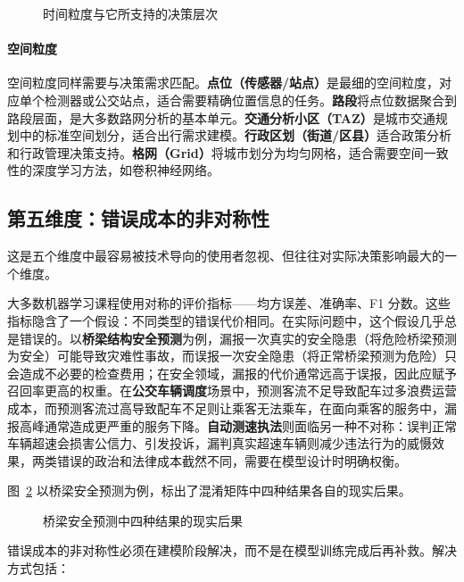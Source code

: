 \begin{figure}[H]
  \centering
  \caption{时间粒度与它所支持的决策层次}
  \label{fig:ch03_gran}
\end{figure}

\paragraph{空间粒度}

空间粒度同样需要与决策需求匹配。\textbf{点位（传感器/站点）}是最细的空间粒度，对应单个检测器或公交站点，适合需要精确位置信息的任务。\textbf{路段}将点位数据聚合到路段层面，是大多数路网分析的基本单元。\textbf{交通分析小区（TAZ）}是城市交通规划中的标准空间划分，适合出行需求建模。\textbf{行政区划（街道/区县）}适合政策分析和行政管理决策支持。\textbf{格网（Grid）}将城市划分为均匀网格，适合需要空间一致性的深度学习方法，如卷积神经网络。

\subsection{第五维度：错误成本的非对称性}

这是五个维度中最容易被技术导向的使用者忽视、但往往对实际决策影响最大的一个维度。

大多数机器学习课程使用对称的评价指标——均方误差、准确率、F1 分数。这些指标隐含了一个假设：不同类型的错误代价相同。在实际问题中，这个假设几乎总是错误的。以\textbf{桥梁结构安全预测}为例，漏报一次真实的安全隐患（将危险桥梁预测为安全）可能导致灾难性事故，而误报一次安全隐患（将正常桥梁预测为危险）只会造成不必要的检查费用；在安全领域，漏报的代价通常远高于误报，因此应赋予召回率更高的权重。在\textbf{公交车辆调度}场景中，预测客流不足导致配车过多浪费运营成本，而预测客流过高导致配车不足则让乘客无法乘车，在面向乘客的服务中，漏报高峰通常造成更严重的服务下降。\textbf{自动测速执法}则面临另一种不对称：误判正常车辆超速会损害公信力、引发投诉，漏判真实超速车辆则减少违法行为的威慑效果，两类错误的政治和法律成本截然不同，需要在模型设计时明确权衡。

图~\ref{fig:ch03_cost} 以桥梁安全预测为例，标出了混淆矩阵中四种结果各自的现实后果。

\begin{figure}[H]
  \centering
  \caption{桥梁安全预测中四种结果的现实后果}
  \label{fig:ch03_cost}
\end{figure}

错误成本的非对称性必须在建模阶段解决，而不是在模型训练完成后再补救。解决方式包括：

